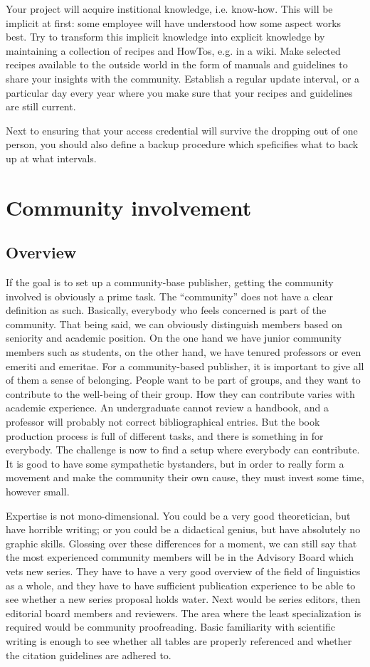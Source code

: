 \documentclass[guidelines,nonflat,modfonts] {langsci/langscibook}
\begin{document}
Your project will acquire institional knowledge, i.e. know-how. This will be implicit at first: some employee will have understood how some aspect works best. Try to transform this implicit knowledge into explicit knowledge by maintaining a collection of recipes and HowTos, e.g. in  a wiki. Make selected recipes available to the outside world in the form of manuals and guidelines to share your insights with the community. Establish a regular update interval, or a particular day every year where you make sure that your recipes and guidelines are still current. 

Next to ensuring that your access credential will survive the dropping out of one person, you should also define a backup procedure which speficifies what to back up at what intervals. 


\section{Community involvement}
\subsection{Overview}
If the goal is to set up a community-base publisher, getting the community involved is obviously a prime task. The ``community'' does not have a clear definition as such. Basically, everybody who feels concerned is part of the community. That being said, we can obviously distinguish members based on seniority and academic position. On the one hand we have junior community members such as students, on the other hand, we have tenured professors or even emeriti and emeritae. For a community-based publisher, it is important to give all of them a sense of belonging. People want to be part of groups, and they want to contribute to the well-being of their group. How they can contribute varies with academic experience. An undergraduate cannot review a handbook, and a professor will probably not correct bibliographical entries. But the book production process is full of different tasks, and there is something in for everybody. The challenge is now to find a setup where everybody can contribute. It is good to have some sympathetic bystanders, but in order to really form a movement and make the community their own cause, they must invest some time, however small. 

Expertise is not mono-dimensional. You could be a very good theoretician, but have horrible writing; or you could be a didactical genius, but have absolutely no graphic skills. Glossing over these differences for a moment, we can still say that the most experienced community members will be in the Advisory Board which vets new series. They have to have a very good overview of the field of linguistics as a whole, and they have to have sufficient publication experience to be able to see whether a new series proposal holds water. Next would be series editors, then editorial board members and reviewers. The area where the least specialization is required would be community proofreading. Basic familiarity with scientific writing is enough to see whether all tables are properly referenced and whether the citation guidelines are adhered to. 
\end{document}
